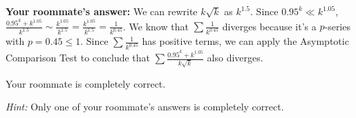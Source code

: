 \documentclass[main]{subfiles}
\begin{document}
\begin{enumerate}
\begin{enumerate}
\begin{problem}
     \textbf{Your roommate's answer:} We can rewrite $k \sqrt{k}$ as $k^{1.5}$.
     Since $0.95^k \ll k^{1.05}$, $\displaystyle \frac{0.95^k +
       k^{1.05}}{k^{1.5}} \sim \frac{k^{1.05}}{k^{1.5}} =
     \frac{k^{1.05}}{k^{1.5}} = \frac{1}{k^{0.45}}$.  We know that
     $\displaystyle \sum \frac{1}{k^{0.45}}$ diverges because it's a
     $p$-series with $p = 0.45 \leq 1$.  Since $\displaystyle \sum
     \frac{1}{k^{0.45}}$ has positive terms, we can apply the Asymptotic
     Comparison Test to conclude that $\displaystyle \sum \frac{0.95^k +
       k^{1.05}}{k \sqrt{k}}$ also diverges.
   \end{problem}

   \begin{solution}
     Your roommate is completely correct.
   \end{solution}
   
 \end{enumerate}

 \begin{problemonly}
   \textit{Hint:} Only one of your roommate's answers is completely correct.
 \end{problemonly}


 \end{enumerate}
\end{document}

